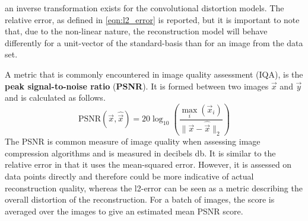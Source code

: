 
an inverse transformation exists for the convolutional distortion models. The relative
error, as defined in \ref{eqn:l2_error} is reported, but it is important to
note that, due to the non-linear nature, the reconstruction model will behave differently 
for a unit-vector 
of the standard-basis than for an image from the data set.

A metric that is commonly encountered in image quality assessment (IQA), is the 
\textbf{peak signal-to-noise ratio} (\textbf{PSNR}).
It is formed between two images $\vec x$ and $\vec y$ and is calculated as follows.
\[
    \text{PSNR}(\vec x, \hat {\vec x}) = 20 \log_{10} \left (\frac {\max_i(\vec x_i)} {\|\vec x-\hat {\vec x}\|_2} \right )
\]
The PSNR is common measure of image quality when assessing image compression algorithms and is measured in decibels db.
It is similar to the relative error in that it uses the mean-squared error. 
However, it is assessed on data points directly and therefore could be more indicative of actual 
reconstruction quality, whereas the l2-error can be seen as a metric describing the 
overall distortion of the reconstruction.
For a batch of images, the score is averaged over the images to give an estimated mean PSNR score.

